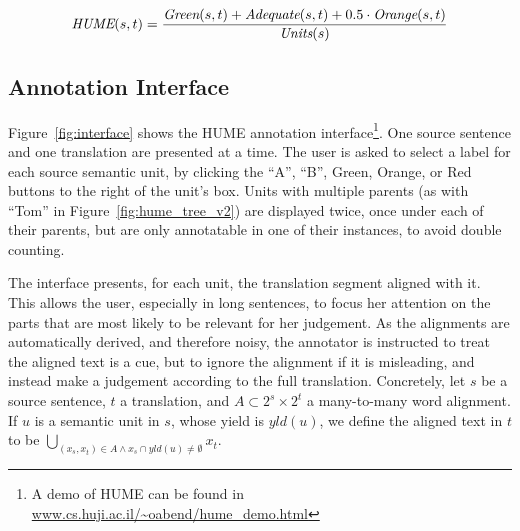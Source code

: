 \documentclass[11pt,letterpaper]{article}
\newcommand{\figref}[1]{Figure~\ref{#1}}
\def\func#1{\text{\it #1}}  %
\def\HUME{\func{HUME}}
\def\Adequate{\func{Adequate}}
\def\Green{\func{Green}}
\def\Orange{\func{Orange}}
\def\Units{\func{Units}}
\begin{document}
\vspace{-.3cm}

{\scriptsize
\begin{equation}
  \HUME(s,t) = \frac{\Green(s,t) + \Adequate(s,t) + 0.5\cdot \Orange(s,t)}{\Units(s)}
  \nonumber
\end{equation}
}

\vspace{-.5cm}


\subsection{Annotation Interface}

\figref{fig:interface} shows the HUME annotation interface\footnote{A demo of HUME
  can be found in \url{www.cs.huji.ac.il/~oabend/hume_demo.html}}.
One source sentence and one translation are presented at a time.
The user is asked to select a label for each source semantic unit,
by clicking the ``A'', ``B'', Green, Orange, or Red buttons to the right of the unit's box.
Units with multiple parents (as with ``Tom'' in \figref{fig:hume_tree_v2}) are displayed
twice, once under each of their parents, but are only annotatable in one of
their instances, to avoid double counting.

The interface presents, for each unit, the translation segment aligned with it.
This allows the user, especially in long sentences, to focus her attention on the parts
that are most likely to be relevant for her judgement. As the alignments are automatically derived,
and therefore noisy, the annotator is instructed to treat the aligned text is a cue, but to ignore
the alignment if it is misleading, and instead 
make a judgement according to the full translation.
Concretely, let $s$ be a source sentence, $t$ a translation,
and $A \subset 2^s \times 2^t$ a many-to-many word alignment.
If $u$ is a semantic unit in $s$, whose yield is $yld(u)$, we define the aligned text in
$t$ to be $\bigcup_{(x_s,x_t) \in A \wedge x_s \cap yld(u) \neq \emptyset} x_t$.
\end{document}
